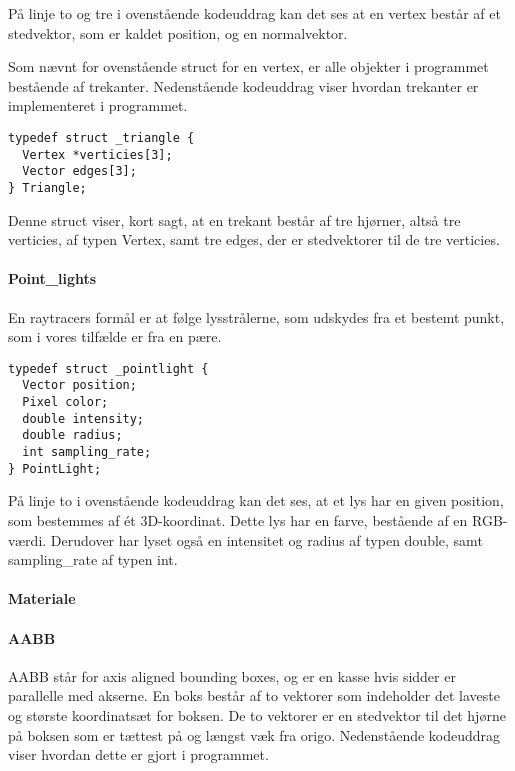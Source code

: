 På linje to og tre i ovenstående kodeuddrag kan det ses at en vertex består af et stedvektor, som er kaldet position, og en normalvektor.
    
Som nævnt for ovenstående struct for en vertex, er alle objekter i programmet bestående af trekanter. Nedenstående kodeuddrag viser hvordan trekanter er implementeret i programmet.
    
\begin{lstlisting}[style=Cstyle, caption=Struct til triangle]
typedef struct _triangle {
  Vertex *verticies[3];
  Vector edges[3];
} Triangle;
\end{lstlisting}

Denne struct viser, kort sagt, at en trekant består af tre hjørner, altså tre verticies, af typen Vertex, samt tre edges, der er stedvektorer til de tre verticies.

\paragraph{Point_lights}

En raytracers formål er at følge lysstrålerne, som udskydes fra et bestemt punkt, som i vores tilfælde er fra en pære. 

\begin{lstlisting}[style=Cstyle, caption=Struct til light]
typedef struct _pointlight {
  Vector position;
  Pixel color;
  double intensity;
  double radius;
  int sampling_rate;
} PointLight;
\end{lstlisting}

På linje to i ovenstående kodeuddrag kan det ses, at et lys har en given position, som bestemmes af ét 3D-koordinat. Dette lys har en farve, bestående af en RGB-værdi. Derudover har lyset også en intensitet og radius af typen double, samt sampling_rate af typen int.

\paragraph{Materiale}



\paragraph{AABB}
AABB står for axis aligned bounding boxes, og er en kasse hvis sidder er parallelle med akserne. En boks består af to vektorer som indeholder det laveste og største koordinatsæt for boksen. De to vektorer er en stedvektor til det hjørne på boksen som er tættest på og længst væk fra origo. Nedenstående kodeuddrag viser hvordan dette er gjort i programmet.

